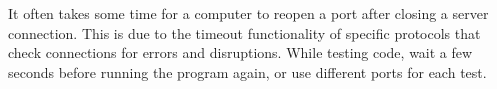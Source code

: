 \begin{warn}
It often takes some time for a computer to reopen a port after closing a server connection.
This is due to the timeout functionality of specific protocols that check connections for errors and disruptions.
While testing code, wait a few seconds before running the program again, or use different ports for each test.
\end{warn}


